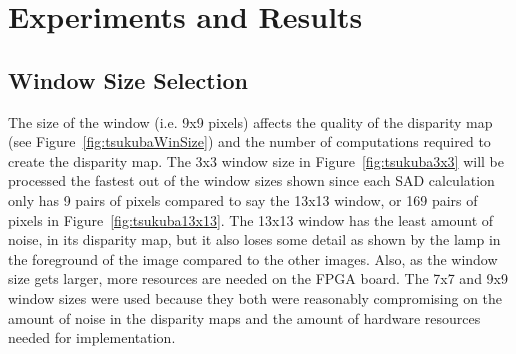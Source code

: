 \newcolumntype{+}{>{\global\let\currentrowstyle\relax}}
\newcolumntype{^}{>{\currentrowstyle}}
\newcommand{\rowstyle}[1]{\gdef\currentrowstyle{#1}%
#1\ignorespaces
}

\chapter{Experiments and Results}
\label{sec:impl}

\section{Window Size Selection}
\label{sec:windowSize}

The size of the window (i.e. 9x9 pixels) affects the quality of the disparity map (see Figure~\ref{fig:tsukubaWinSize}) and the number of computations required to create the disparity map. The 3x3 window size in Figure~\ref{fig:tsukuba3x3} will be processed the fastest  out of the window sizes shown since each SAD calculation only has 9 pairs of pixels compared to say the 13x13 window, or 169 pairs of pixels in Figure~\ref{fig:tsukuba13x13}. The 13x13 window has the least amount of noise, in its disparity map, but it also loses some detail as shown by the lamp in the foreground of the image compared to the other images. Also, as the window size gets larger, more resources are needed on the FPGA board. The 7x7 and 9x9 window sizes were used because they both were reasonably compromising on the amount of noise in the disparity maps and the amount of hardware resources needed for implementation. 

